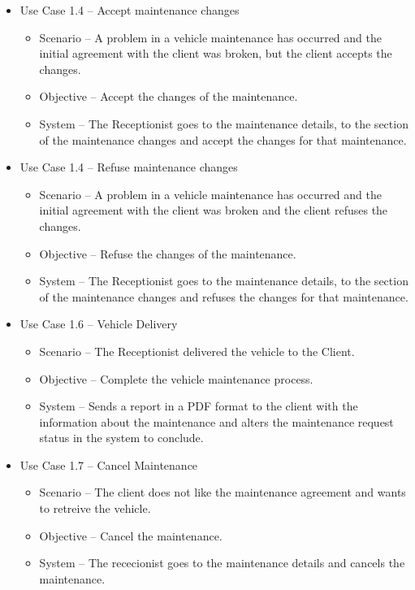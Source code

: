 \begin{itemize}
    \item Use Case 1.4 – Accept maintenance changes
    \begin{itemize}
      \item Scenario – A problem in a vehicle maintenance has occurred and the initial agreement with the client was broken, but the client accepts the changes.
      \item Objective – Accept the changes of the maintenance.
      \item System – The Receptionist goes to the maintenance details, to the section of the maintenance changes and accept the changes for that maintenance.
    \end{itemize}
    \item Use Case 1.4 – Refuse maintenance changes
    \begin{itemize}
      \item Scenario – A problem in a vehicle maintenance has occurred and the initial agreement with the client was broken and the client refuses the changes.
      \item Objective – Refuse the changes of the maintenance.
      \item System – The Receptionist goes to the maintenance details, to the section of the maintenance changes and refuses the changes for that maintenance.
    \end{itemize}
      \item Use Case 1.6 – Vehicle Delivery 
    \begin{itemize}
      \item Scenario – The Receptionist delivered the vehicle to the Client.
      \item Objective – Complete the vehicle maintenance process.
      \item System – Sends a report in a PDF format to the client with the information about the maintenance and alters the maintenance request status in the system to conclude. 
    \end{itemize}
          \item Use Case 1.7 – Cancel Maintenance 
    \begin{itemize}
      \item Scenario – The client does not like the maintenance agreement and wants to retreive the vehicle.
      \item Objective – Cancel the maintenance.
      \item System – The rececionist goes to the maintenance details and cancels the maintenance. 
    \end{itemize}
  \end{itemize}  
  \hfill \break


